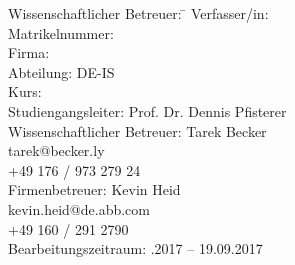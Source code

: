 \begin{titlepage}
\begin{center}
\begin{minipage}{\textwidth}
\begin{tabbing}
	Wissenschaftlicher Betreuer: \hspace{0.85cm}\=\kill
	Verfasser/in: \> \DerAutorDerArbeit \\[1.5mm]
	Matrikelnummer:  \\[1.5mm]
	Firma: \> \DerNameDerFirma  \\[1.5mm]
	Abteilung: \> DE-IS \\[1.5mm]
	Kurs: \> \DieKursbezeichnung \\[1.5mm]
	Studiengangsleiter: \> Prof. Dr. Dennis Pfisterer  \\[1.5mm]
	Wissenschaftlicher Betreuer: \> Tarek Becker \\
	\> tarek@becker.ly \\
	\> +49 176 / 973 279 24 \\[1.5mm]
	Firmenbetreuer: \> Kevin Heid \\
	\> kevin.heid@de.abb.com \\
	\> +49 160 / 291 2790 \\[1.5mm]
	Bearbeitungszeitraum: .2017 -- 19.09.2017
\end{tabbing}
\end{minipage}

\end{center}

\end{titlepage}